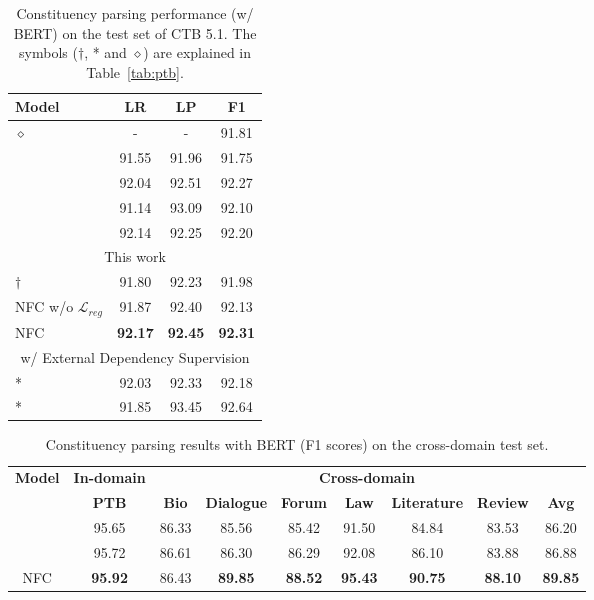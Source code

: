 \documentclass[11pt]{article}
\begin{document}
\begin{table}[t!]
\centering
    \begin{adjustbox}{max width=1.0\columnwidth}
    \begin{tabular}{lccc}
    \hline
        {\bf Model} & {\bf LR} & {\bf LP} & {\bf F1} \\
        \hline
\citet{liu-zhang-2017-order} $\diamond$ & - & - & 91.81 \\
        \citet{san-constituency} & 91.55 & 91.96 & 91.75 \\
        \citet{constituency-crf} & 92.04 & 92.51 & 92.27 \\
\citet{head-driven}  & 91.14 & 93.09 & 92.10 \\
        \citet{span-attention} & 92.14 & 92.25 & 92.20 \\
        \hline
        \multicolumn{4}{c}{This work} \\
        \hline
        \citet{san-constituency} $\dagger$ & 91.80 & 92.23 & 91.98 \\
        NFC w/o $\mathcal{L}_{reg}$ & 91.87 & 92.40 & 92.13 \\
NFC & {\bf 92.17} & {\bf 92.45} & {\bf 92.31} \\
        \hline
        \multicolumn{4}{c}{w/ External Dependency Supervision} \\
        \hline
        \citet{head-driven} * & 92.03 & 92.33 & 92.18 \\
        \citet{label-attention-parsing}* & 91.85 & 93.45 & 92.64 \\
        
\hline
    \end{tabular}
    \end{adjustbox}
    \caption{Constituency parsing performance (w/ BERT) on the test set of CTB 5.1. The symbols ($\dagger$, * and $\diamond$) are explained in Table~\ref{tab:ptb}.}
    \label{tab:ctb}
\end{table}

\begin{table*}[th!]
    \fontsize{10}{12}\selectfont
    \centering
    \begin{tabular}{c|c|cccccc|c}
\hline
\multirow{2}{*}{\bf Model} & {\bf In-domain} &  & \multicolumn{5}{c}{\bf Cross-domain} \\
        \cline{2-9}
         & \bf PTB & \bf Bio & \bf Dialogue & \bf Forum &\bf Law & \bf Literature & \bf Review & \bf Avg \\
        \hline
        \citet{liu-zhang-2017-order}     & 95.65 & 86.33 & 85.56 & 85.42 & 91.50 & 84.84 & 83.53 & 86.20\\
\citet{san-constituency}         & 95.72 & 86.61 & 86.30 & 86.29 & 92.08 & 86.10 & 83.88 & 86.88 \\
    \hline
        NFC & {\bf 95.92} & 86.43 & {\bf 89.85} & {\bf 88.52} & {\bf 95.43} & {\bf 90.75} & {\bf 88.10} & {\bf 89.85} \\
\hline
    \end{tabular}
    \caption{Constituency parsing results with BERT (F1 scores) on the cross-domain test set. }
    \label{tab:cross-domain}
\end{table*}
\end{document}
